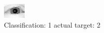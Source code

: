 \begin{figure}[h!]
\begin{center}
\includegraphics[width=0.60\columnwidth]{figures/ID3081_class_1_target_2.png}
\end{center}
\caption{ Classification: 1 actual target: 2}
\label{fig:ID3081_class_1_target_2}
\end{figure}
